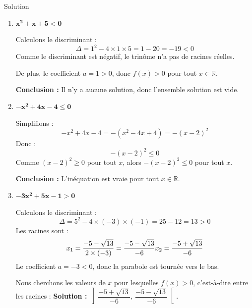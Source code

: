\documentclass[a4paper,12pt]{article}
\begin{document}
\begin{solutionbox}{Solution}
\begin{enumerate}
    Le coefficient directeur \(a = 2 > 0\), donc la parabole est tournée vers le haut.


    Nous cherchons les valeurs de \(x\) pour lesquelles \(f(x) < 0\) :
    \[
    -1 < x < \dfrac{1}{2}
    \]
    \textbf{Solution :} \( \left]-1,\ \dfrac{1}{2}\right[ \).

    \item \(\boldsymbol{x^2 + x + 5 < 0}\)

    Calculons le discriminant :
    \[
    \Delta = 1^2 - 4 \times 1 \times 5 = 1 - 20 = -19 < 0
    \]
    Comme le discriminant est négatif, le trinôme n'a pas de racines réelles.

    De plus, le coefficient \(a = 1 > 0\), donc \(f(x) > 0\) pour tout \(x \in \mathbb{R}\).

    \textbf{Conclusion :} Il n'y a aucune solution, donc l'ensemble solution est vide.

    \item \(\boldsymbol{-x^2 + 4x - 4 \leq 0}\)

    Simplifions :
    \[
    -x^2 + 4x - 4 = -(x^2 - 4x + 4) = -(x - 2)^2
    \]
    Donc :
    \[
    -(x - 2)^2 \leq 0
    \]
    Comme \((x - 2)^2 \geq 0\) pour tout \(x\), alors \(-(x - 2)^2 \leq 0\) pour tout \(x\).

    \textbf{Conclusion :} L'inéquation est vraie pour tout \(x \in \mathbb{R}\).

    \item \(\boldsymbol{-3x^2 + 5x - 1 > 0}\)

    Calculons le discriminant :
    \[
    \Delta = 5^2 - 4 \times (-3) \times (-1) = 25 - 12 = 13 > 0
    \]
    Les racines sont :
    \[
    x_1 = \dfrac{-5 - \sqrt{13}}{2 \times (-3)} = \dfrac{-5 - \sqrt{13}}{-6} \\
    x_2 = \dfrac{-5 + \sqrt{13}}{-6}
    \]
    Le coefficient \(a = -3 < 0\), donc la parabole est tournée vers le bas.


    Nous cherchons les valeurs de \(x\) pour lesquelles \(f(x) > 0\), c'est-à-dire entre les racines :
    \textbf{Solution :} \( \left] \dfrac{-5 + \sqrt{13}}{-6},\ \dfrac{-5 - \sqrt{13}}{-6} \right[ \).

\end{enumerate}
\end{solutionbox}
\end{document}
